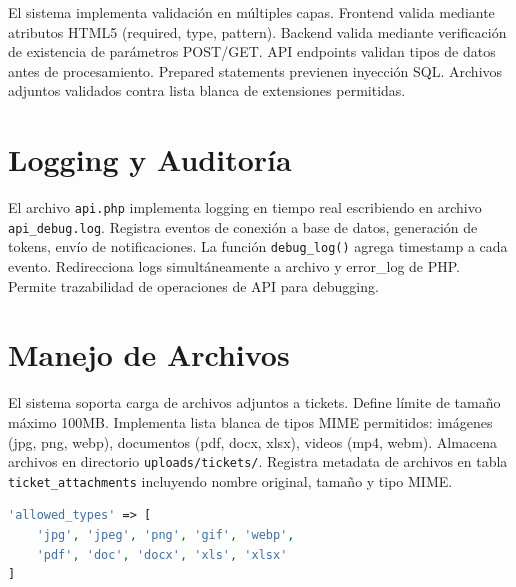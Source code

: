 \documentclass[12pt,a4paper]{article}
\begin{document}
El sistema implementa validación en múltiples capas. Frontend valida mediante atributos HTML5 (required, type, pattern). Backend valida mediante verificación de existencia de parámetros POST/GET. API endpoints validan tipos de datos antes de procesamiento. Prepared statements previenen inyección SQL. Archivos adjuntos validados contra lista blanca de extensiones permitidas.

\section{Logging y Auditoría}

El archivo \texttt{api.php} implementa logging en tiempo real escribiendo en archivo \texttt{api\_debug.log}. Registra eventos de conexión a base de datos, generación de tokens, envío de notificaciones. La función \texttt{debug\_log()} agrega timestamp a cada evento. Redirecciona logs simultáneamente a archivo y error\_log de PHP. Permite trazabilidad de operaciones de API para debugging.

\section{Manejo de Archivos}

El sistema soporta carga de archivos adjuntos a tickets. Define límite de tamaño máximo 100MB. Implementa lista blanca de tipos MIME permitidos: imágenes (jpg, png, webp), documentos (pdf, docx, xlsx), videos (mp4, webm). Almacena archivos en directorio \texttt{uploads/tickets/}. Registra metadata de archivos en tabla \texttt{ticket\_attachments} incluyendo nombre original, tamaño y tipo MIME.

\begin{lstlisting}[language=PHP,caption={Validación archivos}]
'allowed_types' => [
    'jpg', 'jpeg', 'png', 'gif', 'webp',
    'pdf', 'doc', 'docx', 'xls', 'xlsx'
]
\end{lstlisting}
\end{document}

